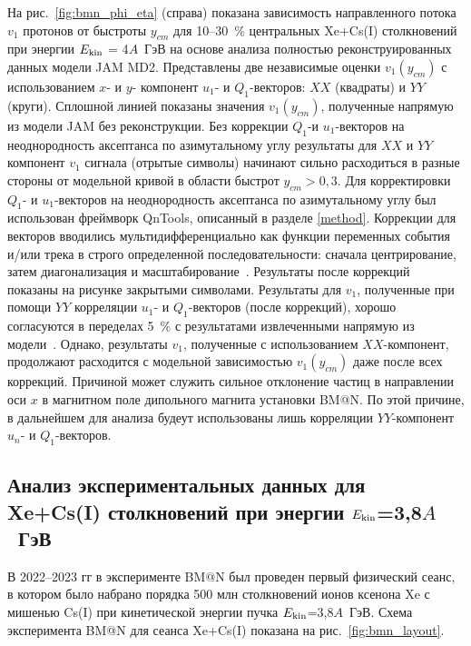 На рис.~\ref{fig:bmn_phi_eta} (справа) показана зависимость направленного потока $v_1$ протонов от быстроты $y_{cm}$ для
10--30~\% центральных Xe+Cs(I) столкновений при энергии $E_{\rm kin}$ =  4$A$~ГэВ на основе анализа полностью реконструированных данных модели JAM MD2.  
Представлены две независимые  оценки $v_1(y_{cm})$ с использованием $x$- и $y$- компонент $u_1$- и $Q_1$-векторов: $XX$ (квадраты) и $YY$ (круги). Сплошной линией показаны значения
 $v_1(y_{cm})$, полученные напрямую из модели JAM без реконструкции. 
 Без коррекции $Q_1$-и $u_1$-векторов на неоднородность аксептанса по азимутальному углу результаты для $XX$  и $YY$ компонент $v_1$ сигнала (отрытые символы) начинают сильно расходиться в разные стороны от модельной кривой  в области быстрот $y_{cm}>0,3$. 
Для корректировки $Q_1$- и $u_1$-векторов на неоднородность аксептанса по азимутальному углу был использован фреймворк  QnTools, описанный в разделе \ref{method}.
Коррекции  для векторов вводились мультидифференциально как функции переменных события и/или трека в строго определенной последовательности: 
сначала центрирование, затем диагонализация и масштабирование~\cite{Selyuzhenkov:2007zi}.  
Результаты после коррекций показаны на рисунке закрытыми символами. 
Результаты для $v_1$, полученные при помощи $YY$ корреляции $u_1$- и $Q_1$-векторов (после коррекций), 
хорошо согласуются в переделах 5~\% с результатами извлеченными напрямую из модели~\cite{Mamaev:2023yhz}. 
Однако, результаты $v_1$, полученные   с использованием $XX$-компонент, продолжают расходится с модельной зависимостью $v_1(y_{cm})$ даже после всех коррекций. 
Причиной может служить сильное отклонение частиц в направлении оси $x$ в магнитном поле дипольного магнита установки BM@N. 
По этой причине, в дальнейшем для анализа будеут использованы лишь корреляции $YY$-компонент $u_n$- и $Q_1$-векторов.

\subsection{Анализ экспериментальных  данных для Xe+Cs(I) столкновений при энергии $E_{\rm kin}$=3,8$A$~ГэВ}
В 2022--2023 гг в эксперименте BM@N \cite{Afanasiev:2023opv} был проведен первый физический сеанс, в котором было набрано порядка 500 млн столкновений ионов ксенона Xe с мишенью Cs(I) при кинетической энергии пучка $E_{\rm kin}$=3,8$A$~ГэВ.
Схема эксперимента BM@N для сеанса Xe+Cs(I) показана на рис.~\ref{fig:bmn_layout}.


